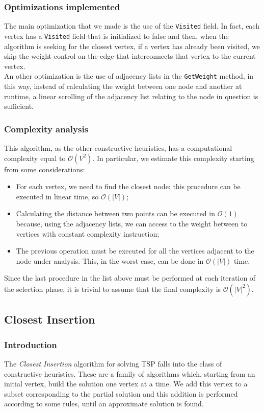 \subsubsection{Optimizations implemented}
The main optimization that we made is the use of the \verb|Visited| field. In fact, each vertex has a \verb|Visited| field that is initialized to false and then, when the algorithm is seeking for the closest vertex, if a vertex has already been visited, we skip the weight control on the edge that interconnects that vertex to the current vertex. \\
An other optimization is the use of adjacency lists in the \verb|GetWeight| method, in this way, instead of calculating the weight between one node and another at runtime, a linear scrolling of the adjacency list relating to the node in question is sufficient.

\subsubsection{Complexity analysis}
This algorithm, as the other constructive heuristics, has a computational complexity equal to $\mathcal{O}(V^2)$. In particular, we estimate this complexity starting from some considerations:
\begin{itemize}
    \item For each vertex, we need to find the closest node: this procedure can be executed in linear time, so $\mathcal{O}(|V|)$;
    \item Calculating the distance between two points can be executed in $\mathcal{O}(1)$ because, using the adjacency lists, we can access to the weight between to vertices with constant complexity instruction;
    \item The previous operation must be executed for all the vertices adjacent to the node under analysis. This, in the worst case, can be done in $\mathcal{O}(|V|)$ time.
\end{itemize}

Since the last procedure in the list above must be performed at each iteration of the selection phase, it is trivial to assume that the final complexity is $\mathcal{O}(|V|^2)$.

\subsection{Closest Insertion}

\subsubsection{Introduction}
The \textit{Closest Insertion} algorithm for solving TSP falls into the class of constructive heuristics. These are a family of algorithms which, starting from an initial vertex, build the solution one vertex at a time. We add this vertex to a subset corresponding to the partial solution and this addition is performed according to some rules, until an approximate solution is found.

